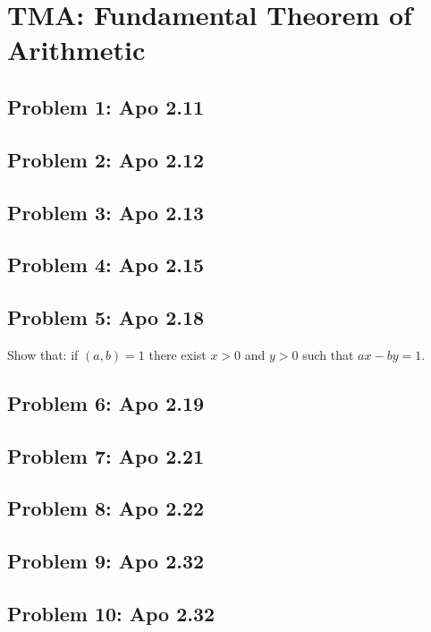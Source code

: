 \section{TMA: Fundamental Theorem of Arithmetic}

\subsection[Problem 1]{Problem 1: Apo 2.11}

\subsection[Problem 2]{Problem 2: Apo 2.12}

\subsection[Problem 3]{Problem 3: Apo 2.13}

\subsection[Problem 4]{Problem 4: Apo 2.15}

\subsection[Problem 5]{Problem 5: Apo 2.18}
Show that: if $(a, b) = 1$ there exist $x >0$ and $y > 0$ such that $ax - by = 1$.

\subsection[Problem 6]{Problem 6: Apo 2.19}

\subsection[Problem 7]{Problem 7: Apo 2.21}

\subsection[Problem 8]{Problem 8: Apo 2.22}

\subsection[Problem 9]{Problem 9: Apo 2.32}

\subsection[Problem 10]{Problem 10: Apo 2.32}